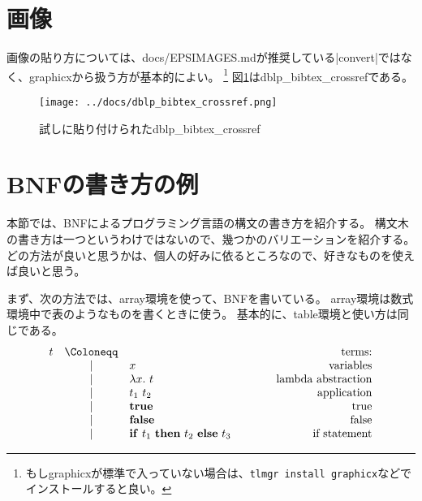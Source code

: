 \documentclass[uplatex]{sumiilab-paper}
\theoremstyle{mystyle}
\numberwithin{definition}{chapter} %
\newcommand{\bkeyword}[1]{\ensuremath{\mathbf{#1}}}
\newcommand{\TRUE}{\bkeyword{true}}
\newcommand{\FALSE}{\bkeyword{false}}
\newcommand{\IF}{\bkeyword{if}}
\newcommand{\THEN}{\bkeyword{then}}
\newcommand{\ELSE}{\bkeyword{else}}
\begin{document}
\section{画像}

画像の貼り方については、docs/EPSIMAGES.mdが推奨している|convert|ではなく、graphicxから扱う方が基本的によい。
\footnote{
もしgraphicxが標準で入っていない場合は、\verb|tlmgr install graphicx|などでインストールすると良い。
}
図\ref{f:aaa}はdblp\_bibtex\_crossrefである。

\begin{figure}[t]
  \centering
  \texttt{[image: ../docs/dblp\_bibtex\_crossref.png]}
\caption{試しに貼り付けられたdblp\_bibtex\_crossref}
\label{f:aaa}
\end{figure}

\section{BNFの書き方の例}

本節では、BNFによるプログラミング言語の構文の書き方を紹介する。
構文木の書き方は一つというわけではないので、幾つかのバリエーションを紹介する。
どの方法が良いと思うかは、個人の好みに依るところなので、好きなものを使えば良いと思う。

まず、次の方法では、array環境を使って、BNFを書いている。
array環境は数式環境中で表のようなものを書くときに使う。
基本的に、table環境と使い方は同じである。
\[
\begin{array}{rcl@{\qquad\qquad}r}
  t & \Coloneqq & & \text{terms:} \\
  & \mid & x & \text{variables} \\
  & \mid & \lambda x.~t & \text{lambda abstraction} \\
  & \mid & t_1~t_2 & \text{application} \\
  & \mid & \TRUE & \text{true} \\
  & \mid & \FALSE & \text{false} \\
  & \mid & \IF~t_1~\THEN~t_2~\ELSE~t_3 & \text{if statement}
\end{array}
\]
\end{document}
